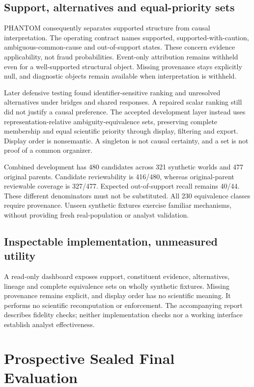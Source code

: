 \documentclass[sigconf,nonacm]{acmart}
\begin{document}
\subsection{Support, alternatives and equal-priority sets}
PHANTOM consequently separates supported structure from causal interpretation. The operating contract names supported, supported-with-caution, ambiguous-common-cause and out-of-support states. These concern evidence applicability, not fraud probabilities. Event-only attribution remains withheld even for a well-supported structural object. Missing provenance stays explicitly null, and diagnostic objects remain available when interpretation is withheld.

Later defensive testing found identifier-sensitive ranking and unresolved alternatives under bridges and shared responses. A repaired scalar ranking still did not justify a causal preference. The accepted development layer instead uses representation-relative ambiguity-equivalence sets, preserving complete membership and equal scientific priority through display, filtering and export. Display order is nonsemantic. A singleton is not causal certainty, and a set is not proof of a common organizer.

Combined development has 480 candidates across 321 synthetic worlds and 477 original parents. Candidate reviewability is 416/480, whereas original-parent reviewable coverage is 327/477. Expected out-of-support recall remains 40/44. These different denominators must not be substituted. All 230 equivalence classes require provenance. Unseen synthetic fixtures exercise familiar mechanisms, without providing fresh real-population or analyst validation.

\subsection{Inspectable implementation, unmeasured utility}
A read-only dashboard exposes support, constituent evidence, alternatives, lineage and complete equivalence sets on wholly synthetic fixtures. Missing provenance remains explicit, and display order has no scientific meaning. It performs no scientific recomputation or enforcement. The accompanying report describes fidelity checks; neither implementation checks nor a working interface establish analyst effectiveness.

\section{Prospective Sealed Final Evaluation}
\label{sec:final}
\end{document}
